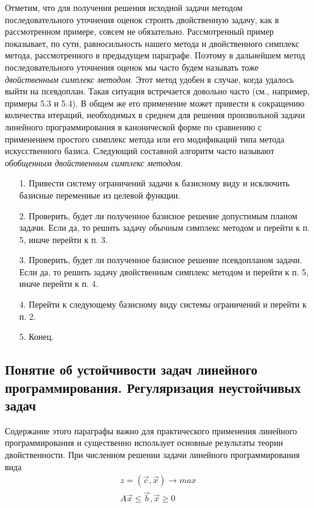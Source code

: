Отметим, что для получения решения исходной задачи методом последовательного уточнения оценок строить двойственную задачу, как в рассмотренном примере, совсем не обязательно. Рассмотренный пример показывает, по сути, равносильность нашего метода и двойственного симплекс метода, рассмотренного в предыдущем параграфе. Поэтому в дальнейшем метод последовательного уточнения оценок мы часто будем называть тоже \textit{двойственным симплекс методом}. Этот метод удобен в случае, когда удалось выйти на псевдоплан. Такая ситуация встречается довольно часто (см., например, примеры 5.3 и 5.4). В общем же его применение может привести к сокращению количества итераций, необходимых в среднем для решения произвольной задачи линейного программирования в канонической форме по сравнению с применением простого симплекс метода или его модификаций типа метода искусственного базиса. Следующий составной алгоритм часто называют \textit{обобщенным двойственным симплекс методом}.
\begin{enumerate}
\item[1.] Привести систему ограничений задачи к базисному виду и исключить базисные переменные из целевой функции.
\item[2.] Проверить, будет ли полученное базисное решение допустимым планом задачи. Если да, то решить задачу обычным симплекс методом и перейти к п. 5, иначе перейти к п. 3.
\item[3.] Проверить, будет ли полученное базисное решение псевдопланом задачи. Если да, то решить задачу двойственным симплекс методом и перейти к п. 5, иначе перейти к п. 4.
\item[4.] Перейти к следующему базисному виду системы ограничений и перейти к п. 2.
\item[5.] Конец.
\end{enumerate}

\subsection{Понятие об устойчивости задач линейного программирования. Регуляризация неустойчивых задач}

Содержание этого параграфы важно для практического применения линейного программирования и существенно использует основные результаты теории двойственности. При численном решении задачи линейного программирования вида
\begin{align}
z = \left(\overrightarrow{c}, \overrightarrow{x}\right) \rightarrow max \\
A\overrightarrow{x} \le \overrightarrow{b}, \overrightarrow{x} \ge 0
\end{align}

